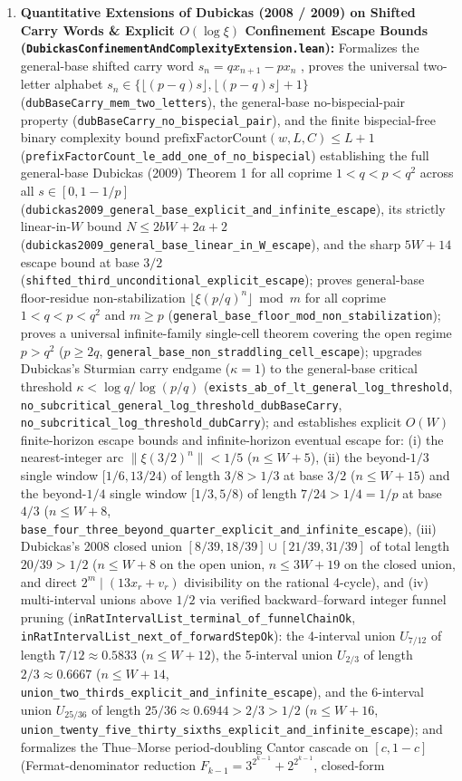 \documentclass[11pt]{article}
\begin{document}
\begin{enumerate}
  \item \textbf{Quantitative Extensions of Dubickas (2008 / 2009) on Shifted Carry Words \& Explicit $O(\log\xi)$ Confinement Escape Bounds (\texttt{DubickasConfinementAndComplexityExtension.lean}):} Formalizes the general-base shifted carry word $s_n = qx_{n+1} - px_n$ \cite{Dub08,Dub09}, proves the universal two-letter alphabet $s_n \in \{\lfloor(p-q)s\rfloor, \lfloor(p-q)s\rfloor+1\}$ (\texttt{dubBaseCarry\_mem\_two\_letters}), the general-base no-bispecial-pair property (\texttt{dubBaseCarry\_no\_bispecial\_pair}), and the finite bispecial-free binary complexity bound $\mathrm{prefixFactorCount}(w, L, C) \le L + 1$ (\texttt{prefixFactorCount\_le\_add\_one\_of\_no\_bispecial}) establishing the full general-base Dubickas (2009) Theorem 1 for all coprime $1 < q < p < q^2$ across all $s \in [0, 1 - 1/p]$ (\texttt{dubickas2009\_general\_base\_explicit\_and\_infinite\_escape}), its strictly linear-in-$W$ bound $N \le 2bW + 2a + 2$ (\texttt{dubickas2009\_general\_base\_linear\_in\_W\_escape}), and the sharp $5W + 14$ escape bound at base $3/2$ (\texttt{shifted\_third\_unconditional\_explicit\_escape}); proves general-base floor-residue non-stabilization $\lfloor \xi(p/q)^n \rfloor \bmod m$ for all coprime $1 < q < p < q^2$ and $m \ge p$ (\texttt{general\_base\_floor\_mod\_non\_stabilization}); proves a universal infinite-family single-cell theorem covering the open regime $p > q^2$ ($p \ge 2q$, \texttt{general\_base\_non\_straddling\_cell\_escape}); upgrades Dubickas's Sturmian carry endgame ($\kappa = 1$) to the general-base critical threshold $\kappa < \log q / \log(p/q)$ (\texttt{exists\_ab\_of\_lt\_general\_log\_threshold}, \texttt{no\_subcritical\_general\_log\_threshold\_dubBaseCarry}, \texttt{no\_subcritical\_log\_threshold\_dubCarry}); and establishes explicit $O(W)$ finite-horizon escape bounds and infinite-horizon eventual escape for: (i) the nearest-integer arc $\|\xi(3/2)^n\| < 1/5$ ($n \le W + 5$), (ii) the beyond-$1/3$ single window $[1/6, 13/24)$ of length $3/8 > 1/3$ at base $3/2$ ($n \le W + 15$) and the beyond-$1/4$ single window $[1/3, 5/8)$ of length $7/24 > 1/4 = 1/p$ at base $4/3$ ($n \le W + 8$, \texttt{base\_four\_three\_beyond\_quarter\_explicit\_and\_infinite\_escape}), (iii) Dubickas's 2008 closed union $[8/39, 18/39] \cup [21/39, 31/39]$ of total length $20/39 > 1/2$ ($n \le W + 8$ on the open union, $n \le 3W + 19$ on the closed union, and direct $2^m \mid (13 x_r + v_r)$ divisibility on the rational 4-cycle), and (iv) multi-interval unions above $1/2$ via verified backward--forward integer funnel pruning (\texttt{inRatIntervalList\_terminal\_of\_funnelChainOk}, \texttt{inRatIntervalList\_next\_of\_forwardStepOk}): the 4-interval union $U_{7/12}$ of length $7/12 \approx 0.5833$ ($n \le W + 12$), the 5-interval union $U_{2/3}$ of length $2/3 \approx 0.6667$ ($n \le W + 14$, \texttt{union\_two\_thirds\_explicit\_and\_infinite\_escape}), and the 6-interval union $U_{25/36}$ of length $25/36 \approx 0.6944 > 2/3 > 1/2$ ($n \le W + 16$, \texttt{union\_twenty\_five\_thirty\_sixths\_explicit\_and\_infinite\_escape}); and formalizes the Thue--Morse period-doubling Cantor cascade on $[c, 1-c]$ (Fermat-denominator reduction $F_{k-1} = 3^{2^{k-1}} + 2^{2^{k-1}}$, closed-form 
\end{enumerate}
\end{document}
